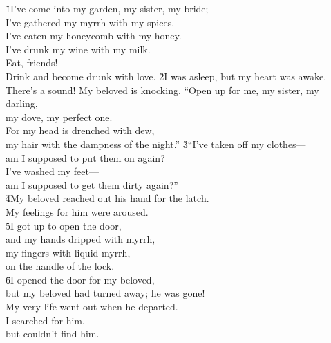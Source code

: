 \begin{poetry}
\poeml {}
\v{1}I've come into my garden, my sister, my bride; \\
\poeml I've gathered my myrrh with my spices. \\
\poeml I've eaten my honeycomb with my honey. \\
\poeml I've drunk my wine with my milk. \\
\poeml Eat, friends! \\
\poemll    Drink and become drunk with love.
\poeml \v{2}I was asleep, but my heart was awake. \\
\poemll    There's a sound! My beloved is knocking.
\poeml ``Open up for me, my sister, my darling, \\
\poemll    my dove, my perfect one. \\
\poeml For my head is drenched with dew, \\
\poemll    my hair with the dampness of the night.''
\poeml \v{3}``I've taken off my clothes--- \\
\poemll    am I supposed to put them on again? \\
\poeml I've washed my feet--- \\
\poemll    am I supposed to get them dirty again?'' \\
\poeml \v{4}My beloved reached out his hand for the latch. \\
\poemll    My feelings for him were aroused. \\
\poeml \v{5}I got up to open the door, \\
\poemll    and my hands dripped with myrrh, \\
\poeml my fingers with liquid myrrh, \\
\poemll    on the handle of the lock. \\
\poeml \v{6}I opened the door for my beloved, \\
\poemll    but my beloved had turned away; he was gone! \\
\poeml My very life went out when he departed. \\
\poemll    I searched for him, \\
\poemlll       but couldn't find him. \\

\end{poetry}
